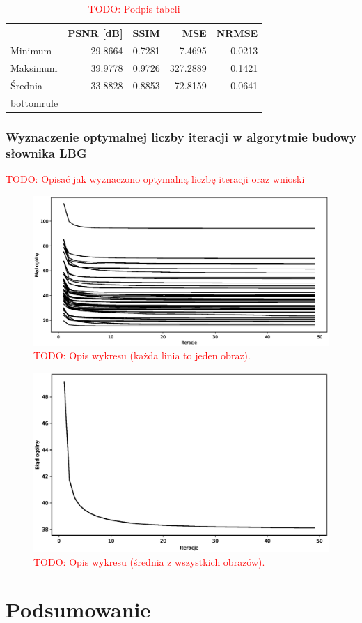 \documentclass{article}
\newcommand{\todo}[1]{\textcolor{red}{TODO: #1}}
\begin{document}
\begin{table}[H]
\centering
\begin{tabular}{@{}lrrrr@{}}
         & PSNR {[}dB{]} & SSIM  & MSE     & NRMSE \\ \midrule
Minimum  & 29.8664       & 0.7281 & 7.4695   & 0.0213 \\
Maksimum & 39.9778       & 0.9726 & 327.2889 & 0.1421 \\
Średnia  & 33.8828       & 0.8853 & 72.8159  & 0.0641 \\ bottomrule
\end{tabular}
\caption{\todo{Podpis tabeli}}
\label{tab:lbg_summary}
\end{table}

\subsubsection{Wyznaczenie optymalnej liczby iteracji w algorytmie budowy słownika LBG}

\todo{Opisać jak wyznaczono optymalną liczbę iteracji oraz wnioski}

\begin{figure}[H]
\centering
  \centering
  \includegraphics[width=.9\linewidth]{images/lbg_4x4_32_50_iterations.eps}  
  \caption{\todo{Opis wykresu (każda linia to jeden obraz).}}
  \label{fig:lbg_iterations}
\end{figure}

\begin{figure}[H]
  \centering
  \includegraphics[width=.9\linewidth]{images/lbg_4x4_32_mean_iterations.eps}  
  \caption{\todo{Opis wykresu (średnia z wszystkich obrazów).}}
  \label{fig:lbg_iterations_mean}
\end{figure}


\FloatBarrier
\section{Podsumowanie}

\lipsum[1-3]

  
\end{document}
